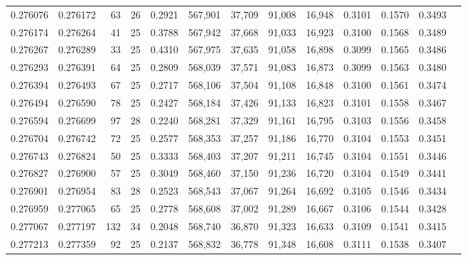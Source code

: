 \begin{tabular}{rrrrrrrrrrrrr}
0.276076 & 0.276172 &  63 &  26 &                                     0.2921 & 567,901 &  37,709 &  91,008 &  16,948 & 0.3101 & 0.1570 & 0.3493 \\
0.276174 & 0.276264 &  41 &  25 &                                     0.3788 & 567,942 &  37,668 &  91,033 &  16,923 & 0.3100 & 0.1568 & 0.3489 \\
0.276267 & 0.276289 &  33 &  25 &                                     0.4310 & 567,975 &  37,635 &  91,058 &  16,898 & 0.3099 & 0.1565 & 0.3486 \\
0.276293 & 0.276391 &  64 &  25 &                                     0.2809 & 568,039 &  37,571 &  91,083 &  16,873 & 0.3099 & 0.1563 & 0.3480 \\
0.276394 & 0.276493 &  67 &  25 &                                     0.2717 & 568,106 &  37,504 &  91,108 &  16,848 & 0.3100 & 0.1561 & 0.3474 \\
0.276494 & 0.276590 &  78 &  25 &                                     0.2427 & 568,184 &  37,426 &  91,133 &  16,823 & 0.3101 & 0.1558 & 0.3467 \\
0.276594 & 0.276699 &  97 &  28 &                                     0.2240 & 568,281 &  37,329 &  91,161 &  16,795 & 0.3103 & 0.1556 & 0.3458 \\
0.276704 & 0.276742 &  72 &  25 &                                     0.2577 & 568,353 &  37,257 &  91,186 &  16,770 & 0.3104 & 0.1553 & 0.3451 \\
0.276743 & 0.276824 &  50 &  25 &                                     0.3333 & 568,403 &  37,207 &  91,211 &  16,745 & 0.3104 & 0.1551 & 0.3446 \\
0.276827 & 0.276900 &  57 &  25 &                                     0.3049 & 568,460 &  37,150 &  91,236 &  16,720 & 0.3104 & 0.1549 & 0.3441 \\
0.276901 & 0.276954 &  83 &  28 &                                     0.2523 & 568,543 &  37,067 &  91,264 &  16,692 & 0.3105 & 0.1546 & 0.3434 \\
0.276959 & 0.277065 &  65 &  25 &                                     0.2778 & 568,608 &  37,002 &  91,289 &  16,667 & 0.3106 & 0.1544 & 0.3428 \\
0.277067 & 0.277197 & 132 &  34 &                                     0.2048 & 568,740 &  36,870 &  91,323 &  16,633 & 0.3109 & 0.1541 & 0.3415 \\
0.277213 & 0.277359 &  92 &  25 &                                     0.2137 & 568,832 &  36,778 &  91,348 &  16,608 & 0.3111 & 0.1538 & 0.3407 \\

\end{tabular}
